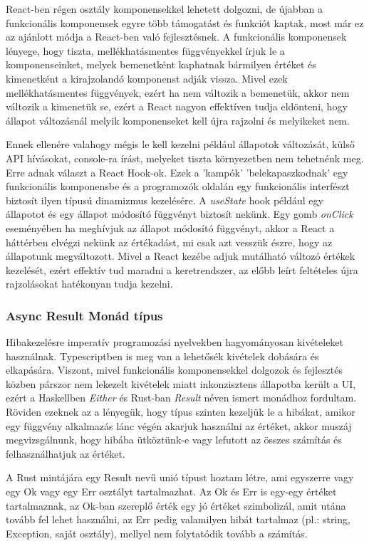 React-ben régen osztály komponensekkel lehetett dolgozni, de újabban a funkcionális komponensek egyre több támogatást és funkciót kaptak, most már ez az ajánlott módja a React-ben való fejlesztésnek. A funkcionális komponensek lényege, hogy tiszta, mellékhatásmentes függvényekkel írjuk le a komponenseinket, melyek bemenetként kaphatnak bármilyen értéket és kimenetként a kirajzolandó komponenst adják vissza. Mivel ezek mellékhatásmentes függvények, ezért ha nem változik a bemenetük, akkor nem változik a kimenetük se, ezért a React nagyon effektíven tudja eldönteni, hogy állapot változásnál melyik komponenseket kell újra rajzolni és melyikeket nem.

Ennek ellenére valahogy mégis le kell kezelni például állapotok változását, külső API hívásokat, console-ra írást, melyeket tiszta környezetben nem tehetnénk meg. Erre adnak választ a React Hook-ok. Ezek a 'kampók' 'belekapaszkodnak' egy funkcionális komponensbe és a programozók oldalán egy funkcionális interfészt biztosít ilyen típusú dinamizmus kezelésére. A \textit{useState} hook például egy állapotot és egy állapot módosító függvényt biztosít nekünk. Egy gomb \textit{onClick} eseményében ha meghívjuk az állapot módosító függvényt, akkor a React a háttérben elvégzi nekünk az értékadást, mi csak azt vesszük észre, hogy az állapotunk megváltozott. Mivel a React kezébe adjuk mutálható változó értékek kezelését, ezért effektív tud maradni a keretrendszer, az előbb leírt feltételes újra rajzolásokat hatékonyan tudja kezelni.

\subsubsection{Async Result Monád típus}

Hibakezelésre imperatív programozási nyelvekben hagyományosan kivételeket használnak. Typescriptben is meg van a lehetősék kivételek dobására és elkapására. Viszont, mivel funkcionális komponensekkel dolgozok és fejlesztés közben párszor nem lekezelt kivételek miatt inkonzisztens állapotba került a UI, ezért a Haskellben \textit{Either} és Rust-ban \textit{Result} néven ismert monádhoz fordultam. Röviden ezeknek az a lényegük, hogy típus szinten kezeljük le a hibákat, amikor egy függvény alkalmazás lánc végén akarjuk használni az értéket, akkor muszáj megvizsgálnunk, hogy hibába ütköztünk-e vagy lefutott az összes számítás és felhasználhatjuk az értéket.

A Rust mintájára egy Result nevű unió típust\cite{tsUnionTypes} hoztam létre, ami egyszerre vagy egy Ok vagy egy Err osztályt tartalmazhat. Az Ok és Err is egy-egy értéket tartalmaznak, az Ok-ban szereplő érték egy jó értéket szimbolizál, amit utána tovább fel lehet használni, az Err pedig valamilyen hibát tartalmaz (pl.: string, Exception, saját osztály), mellyel nem folytatódik tovább a számítás.


